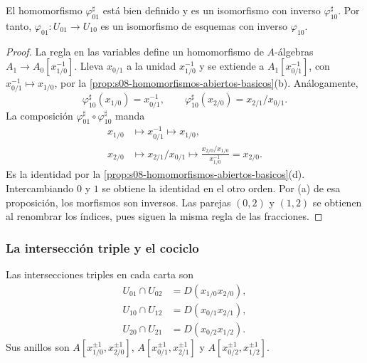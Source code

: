 \begin{prop}
\label{prop:s09-primer-pegado-plano}
El homomorfismo $\varphi_{01}^\sharp$ está bien definido y es un isomorfismo con inverso $\varphi_{10}^\sharp$. Por tanto, $\varphi_{01}\colon U_{01}\to U_{10}$ es un isomorfismo de esquemas con inverso $\varphi_{10}$.
\end{prop}
\begin{proof}
La regla en las variables define un homomorfismo de $A$-álgebras $A_1\to A_0[x_{1/0}^{-1}]$. Lleva $x_{0/1}$ a la unidad $x_{1/0}^{-1}$ y se extiende a $A_1[x_{0/1}^{-1}]$, con $x_{0/1}^{-1}\mapsto x_{1/0}$, por la \cref{prop:s08-homomorfismos-abiertos-basicos}(b). Análogamente,
\[
\varphi_{10}^\sharp(x_{1/0})=x_{0/1}^{-1},
\qquad
\varphi_{10}^\sharp(x_{2/0})=x_{2/1}/x_{0/1}.
\]
La composición $\varphi_{01}^\sharp\circ\varphi_{10}^\sharp$ manda
\[
\begin{aligned}
x_{1/0}&\longmapsto x_{0/1}^{-1}\longmapsto x_{1/0},\\
x_{2/0}&\longmapsto x_{2/1}/x_{0/1}
\longmapsto\frac{x_{2/0}/x_{1/0}}{x_{1/0}^{-1}}=x_{2/0}.
\end{aligned}
\]
Es la identidad por la \cref{prop:s08-homomorfismos-abiertos-basicos}(d). Intercambiando $0$ y $1$ se obtiene la identidad en el otro orden. Por (a) de esa proposición, los morfismos son inversos. Las parejas $(0,2)$ y $(1,2)$ se obtienen al renombrar los índices, pues siguen la misma regla de las fracciones.
\end{proof}

\subsubsection{La intersección triple y el cociclo}

Las intersecciones triples en cada carta son
\[
\begin{aligned}
U_{01}\cap U_{02}&=D(x_{1/0}x_{2/0}),\\
U_{10}\cap U_{12}&=D(x_{0/1}x_{2/1}),\\
U_{20}\cap U_{21}&=D(x_{0/2}x_{1/2}).
\end{aligned}
\]
Sus anillos son $A[x_{1/0}^{\pm1},x_{2/0}^{\pm1}]$, $A[x_{0/1}^{\pm1},x_{2/1}^{\pm1}]$ y $A[x_{0/2}^{\pm1},x_{1/2}^{\pm1}]$.

